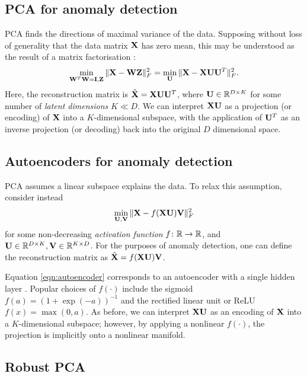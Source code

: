 %
\subsection{PCA for anomaly detection}

PCA finds the directions of maximal variance of the data.
Supposing without loss of generality that the data matrix $\mathbf{X}$ has zero mean,
this may be understood as the result of a matrix factorisation \cite{Bishop:2006}:
\begin{equation}
	\label{eqn:pca}
	\min_{\mathbf{W}^T \mathbf{W} = \mathbf{I}, \mathbf{Z}} \| \mathbf{X} - \mathbf{W} \mathbf{Z} \|_F^2 = \min_{\mathbf{U}} \| \mathbf{X} - \mathbf{X} \mathbf{U} \mathbf{U}^T \|_F^2.
\end{equation}
Here,
the reconstruction matrix is $\hat{\mathbf{X}} = \mathbf{X} \mathbf{U} \mathbf{U}^T$,
where
$\mathbf{U} \in \mathbb{R}^{D \times K}$ for some number of \emph{latent dimensions} $K \ll D$.
We can interpret $\mathbf{X} \mathbf{U}$ as a projection (or encoding) of $\mathbf{X}$ into a $K$-dimensional subspace,
with the application of $\mathbf{U}^T$ as an inverse projection (or decoding) back into the original $D$ dimensional space.


%
\subsection{Autoencoders for anomaly detection}

PCA assumes a linear subspace explains the data.
To relax this assumption, consider instead
\begin{equation}
	\label{eqn:autoencoder}
	\min_{\mathbf{U}, \mathbf{V}} \| \mathbf{X} - f( \mathbf{X} \mathbf{U} ) \mathbf{V} \|_F^2
\end{equation}
for some non-decreasing \emph{activation function} $f \colon \mathbb{R} \to \mathbb{R}$,
and $\mathbf{U} \in \mathbb{R}^{D \times K}, \mathbf{V} \in \mathbb{R}^{K \times D}$.
For the purposes of anomaly detection, one can define the reconstruction matrix as $\hat{\mathbf{X}} = f( \mathbf{X} \mathbf{U} ) \mathbf{V}$.

Equation \ref{eqn:autoencoder} corresponds to an autoencoder with a single hidden layer \cite{Goodfellow-et-al-2016}.
Popular choices of $f( \cdot )$ include the sigmoid $f( a ) = (1 + \exp(-a))^{-1}$ and the rectified linear unit or ReLU $f( x ) = \max(0, a)$.
As before, we can interpret $\mathbf{X} \mathbf{U}$ as an encoding of $\mathbf{X}$ into a $K$-dimensional subspace; however,
by applying a nonlinear $f( \cdot )$,
the projection is implicitly onto a nonlinear manifold.


%
\subsection{Robust PCA}

